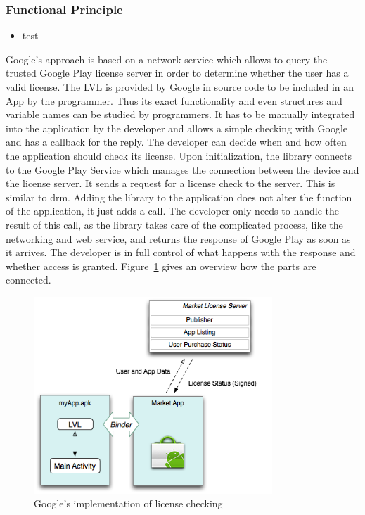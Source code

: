 \subsubsection{Functional Principle} \label{section:license-google-functional}
\begin{itemize}
    \item test
\end{itemize}
Google's approach is based on a network service which allows to query the trusted Google Play license server in order to determine whether the user has a valid license.
The LVL is provided by Google in source code to be included in an App by the programmer. Thus its exact functionality and even structures and variable names can be studied by programmers. \cite{munteanLicense}
\newline
It has to be manually integrated into the application by the developer and allows a simple checking with Google and has a callback for the reply.
The developer can decide when and how often the application should check its license.
Upon initialization, the library connects to the Google Play Service which manages the connection between the device and the license server.
It sends a request for a license check to the server.
This is similar to \gls{drm}.
Adding the library to the application does not alter the function of the application, it just adds a call.
The developer only needs to handle the result of this call, as the library takes care of the complicated process, like the networking and web service, and returns the response of Google Play as soon as it arrives.
The developer is in full control of what happens with the response and whether access is granted.
Figure~\ref{fig:lvl} gives an overview how the parts are connected. \cite{digipomLvl} \cite{developersLicensingOverview}
\newline
\begin{figure}[h]
    \centering
    \includegraphics[width=0.8\textwidth]{data/lvl.png}
    \caption{Google's implementation of license checking \cite{developersLicensingOverview}}
    \label{fig:lvl}
\end{figure}
